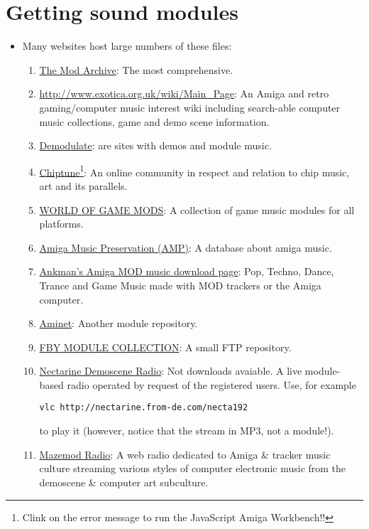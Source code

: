 \section{Getting sound modules}
\begin{itemize}
\item Many websites host large numbers of these files:
  \begin{enumerate}
  \item \href{http://modarchive.org/index.php}{The Mod Archive}: The
    most comprehensive.
  \item \href{ExoticA}{http://www.exotica.org.uk/wiki/Main\_Page}: An
    Amiga and retro gaming/computer music interest wiki including
    search-able computer music collections, game and demo scene
    information.
  \item \href{http://demodulate.scene.org/}{Demodulate}: are sites
    with demos and module music.
  \item \href{http://www.chiptune.com/}{Chiptune}\footnote{Clink on
      the error message to run the JavaScript Amiga Workbench!!}: An
    online community in respect and relation to chip music, art and
    its parallels.
  \item \href{http://www.mirsoft.info/gamemods.php}{WORLD OF GAME
      MODS}: A collection of game music modules for all platforms.
  \item \href{http://amp.dascene.net/home.php}{Amiga Music
      Preservation (AMP)}: A database about amiga music.
  \item \href{http://www.ankman.de/amiga-mod-music/}{Ankman's Amiga
      MOD music download page}: Pop, Techno, Dance, Trance and Game
    Music made with MOD trackers or the Amiga computer.
  \item \href{http://aminet.net/tree?path=mods}{Aminet}: Another
    module repository.
  \item \href{http://fby.develer.com/fby/modulescollection.html}{FBY
      MODULE COLLECTION}: A small FTP repository.
  \item \href{https://www.scenemusic.net/demovibes/}{Nectarine
      Demoscene Radio}: Not downloads avaiable. A live module-based
    radio operated by request of the registered users. Use, for example
\begin{verbatim}
vlc http://nectarine.from-de.com/necta192
\end{verbatim}
    to play it (however, notice that the stream in MP3, not a
    module!).
  \item \href{http://www.mazemod.org/}{Mazemod Radio}: A web radio
    dedicated to Amiga \& tracker music culture streaming various
    styles of computer electronic music from the demoscene \& computer
    art subculture.
  \end{enumerate}
\end{itemize}

